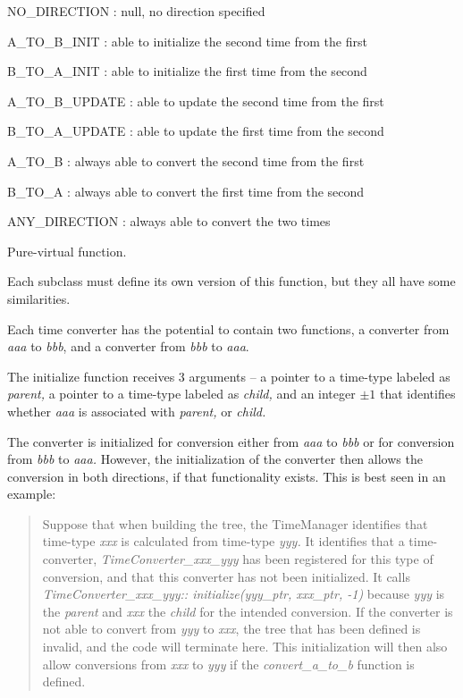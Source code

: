 {\begin{enumerate}
{\begin{enumerate}
NO\_DIRECTION : null, no direction specified

A\_TO\_B\_INIT : able to initialize the second time from the first

B\_TO\_A\_INIT : able to initialize the first time from the second

A\_TO\_B\_UPDATE : able to update the second time from the first

B\_TO\_A\_UPDATE : able to update the first time from the second

A\_TO\_B : always able to convert the second time from the first

B\_TO\_A : always able to convert the first time from the second

ANY\_DIRECTION : always able to convert the two times


\label{ref:TimeConverterinitialize}
Pure-virtual function.

Each subclass must define its own version of this function, but they
all have some similarities.

Each time converter has the potential to contain two functions, a
converter from \textit{aaa} to \textit{bbb}, and a converter from
\textit{bbb} to \textit{aaa}.

The initialize function receives 3 arguments -- a pointer to a
time-type labeled as \textit{parent, }a pointer to a time-type labeled
as \textit{child, }and an integer  $\pm 1$ that identifies whether
\textit{aaa }is associated with \textit{parent, }or \textit{child.}

The converter is initialized for conversion either from \textit{aaa} to
\textit{bbb }or for conversion from \textit{bbb} to\textit{ aaa.
}However, the initialization of the converter then allows the
conversion in both directions, if that functionality exists.  This is
best seen in an example:

\begin{quotation}
Suppose that when building the tree, the TimeManager identifies that
time-type \textit{xxx} is calculated from time-type \textit{yyy.  }It
identifies that a time-converter, \textit{TimeConverter\_xxx\_yyy} has
been registered for this type of conversion, and that this converter
has not been initialized.  It calls
\textit{TimeConverter\_xxx\_yyy:: initialize(yyy\_ptr, xxx\_ptr, -1)}
because \textit{yyy} is the \textit{parent} and \textit{xxx} the
\textit{child} for the intended conversion.  If the converter is not
able to convert from \textit{yyy} to \textit{xxx}, the tree that has
been defined is invalid, and the code will terminate here.  This
initialization will then also allow conversions from \textit{xxx }to
\textit{yyy} if the \textit{convert\_a\_to\_b} function is defined.
\end{quotation}


\end{enumerate}}
\end{enumerate}}
